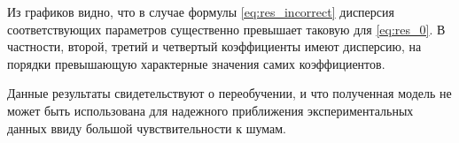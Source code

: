 \documentclass[11pt,a4paper]{article}
\theoremstyle{definition}
\begin{document}
Из графиков видно, что в случае формулы \eqref{eq:res_incorrect} дисперсия соответствующих
параметров существенно превышает таковую для \eqref{eq:res_0}. В частности, второй, третий
и четвертый коэффициенты имеют дисперсию, на порядки превышающую характерные значения самих
коэффициентов.

Данные результаты свидетельствуют о переобучении, и что полученная модель не может быть
использована для надежного приближения экспериментальных данных ввиду большой чувствительности
к шумам.

\end{document}
